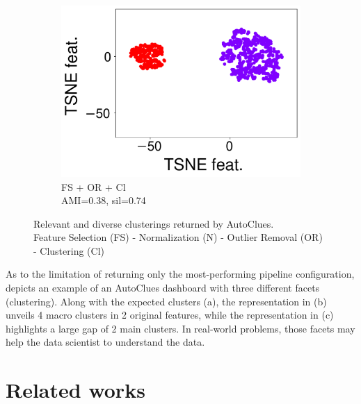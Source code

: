 \documentclass[runningheads]{llncs}
\begin{document}
\begin{figure}[t]
\begin{subfigure}[t]{0.31\columnwidth}
        \centering
        \includegraphics[scale=.15]{img/dashboard_2_pred.pdf}  
        \caption{FS + OR + Cl\\ \scriptsize{AMI=0.38, sil=0.74}}
        \label{fig:d2}
    \end{subfigure}
    \caption{Relevant and diverse clusterings returned by AutoClues.\\
    \small{Feature Selection (FS) - Normalization (N) - Outlier Removal (OR) - Clustering (Cl)}}
    \label{fig:dashboard}
\end{figure}

As to the limitation of returning only the most-performing pipeline configuration,  depicts an example of an AutoClues dashboard with three different facets (clustering).
Along with the expected clusters (a), the representation in (b) unveils 4 macro clusters in 2 original features, while the representation in (c) highlights a large gap of 2 main clusters.
In real-world problems, those facets may help the data scientist to understand the data.


\section{Related works}\label{sec:related}
\end{document}
